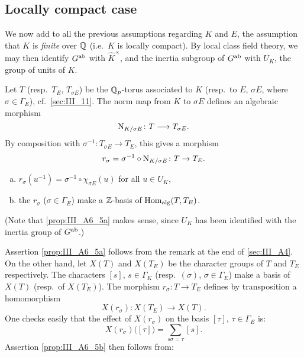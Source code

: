 \begin{subappendices}
\subsection{Locally compact case}
\label{sec:III_A6}
We now add to all the previous assumptions regarding $K$ and
$E$, the assumption that $K$ is \emph{finite} over $\mathbb{Q}$ (i.e.\ $K$ is locally
compact). By local class field theory, we may then identify $G^{\mathrm{ab}}$
with $\widehat{K}^\times$, and the inertia subgroup of $G^{\mathrm{ab}}$ with $U_K$, the group
of units of $K$.

Let $T$ (resp.\ $T_E$, $T_{\sigma E}$) be the $\mathbb{Q}_p$-torus associated to $K$
(resp.\ to $E$, $\sigma E$, where $\sigma \in \Gamma_E$), cf.\
\ref{sec:III_11}. The norm map from $K$ to $\sigma E$ defines an algebraic
morphism
\[
	\operatorname{N}_{K/\sigma E} \colon T \longrightarrow T_{\sigma E}.
\]
By composition with $\sigma^{-1} \colon T_{\sigma E} \to T_E$,
\dpage
this gives a morphism
\[
	r_\sigma = \sigma^{-1} \circ \operatorname{N}_{K/\sigma E} \colon T \to T_E.
\]
\begin{prop}\label{prop:III_A6_5}
\begin{enumerate}[(a)]
	\item\label{prop:III_A6_5a}
		$r_\sigma(u^{-1}) = \sigma^{-1}\circ\chi_{\sigma E}(u)$ for all
		$u \in U_K$,
	\item\label{prop:III_A6_5b}
		the $r_\sigma$ ($\sigma \in \Gamma_E$) make a $\mathbb{Z}$-basis of
		$\operatorname{Hom}_{\rm alg}(T, T_E)$.
\end{enumerate}
\end{prop}
(Note that \ref{prop:III_A6_5a} makes sense, since $U_K$ has been identified with
the inertia group of $G^{\mathrm{ab}}$.)

Assertion \ref{prop:III_A6_5a} follows from the remark at the end of
\ref{sec:III_A4}. On the other hand, let $X(T)$ and $X(T_E)$ be the character
groups of $T$ and $T_E$ respectively. The characters $[s]$, $s \in \Gamma_K$
(resp.\ $(\sigma)$, $\sigma \in \Gamma_E$) make a basis of $X(T)$ (resp.\ of
$X(T_E)$). The morphism $r_\sigma \colon T \to T_E$ defines by transposition a homomorphism
\[
	X(r_\sigma)\colon X(T_E) \longrightarrow X(T).
\]
One checks easily that the effect of $X(r_\sigma)$ on the basis $[\tau]$, $\tau \in \Gamma_E$ is:
\[
	X(r_\sigma)\big( [\tau] \big) = \sum_{s \sigma = \tau} [s].
\]
Assertion \ref{prop:III_A6_5b} then follows from:


\end{subappendices}
